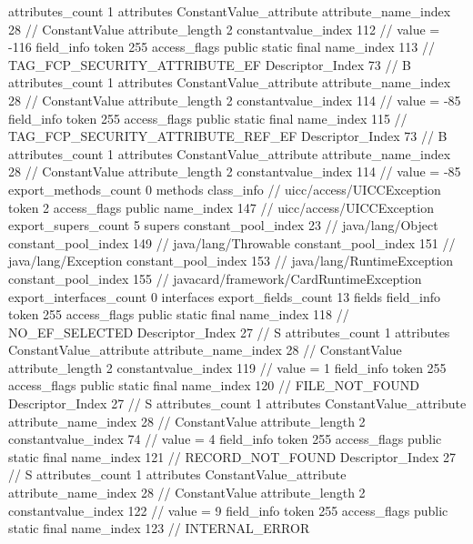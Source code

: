 {{{{{				attributes_count	1
				attributes {
				ConstantValue_attribute {
					attribute_name_index	28		// ConstantValue
					attribute_length	2
					constantvalue_index	112		// value = -116
				}
				}
			}
			field_info {
				token	255
				access_flags	public static final
				name_index	113		// TAG_FCP_SECURITY_ATTRIBUTE_EF
				Descriptor_Index	73		// B
				attributes_count	1
				attributes {
				ConstantValue_attribute {
					attribute_name_index	28		// ConstantValue
					attribute_length	2
					constantvalue_index	114		// value = -85
				}
				}
			}
			field_info {
				token	255
				access_flags	public static final
				name_index	115		// TAG_FCP_SECURITY_ATTRIBUTE_REF_EF
				Descriptor_Index	73		// B
				attributes_count	1
				attributes {
				ConstantValue_attribute {
					attribute_name_index	28		// ConstantValue
					attribute_length	2
					constantvalue_index	114		// value = -85
				}
				}
			}
			}
			export_methods_count	0
			methods {
			}
		}
		class_info {		// uicc/access/UICCException
			token	2
			access_flags	public
			name_index	147		// uicc/access/UICCException
			export_supers_count	5
			supers {
				constant_pool_index	23		// java/lang/Object
				constant_pool_index	149		// java/lang/Throwable
				constant_pool_index	151		// java/lang/Exception
				constant_pool_index	153		// java/lang/RuntimeException
				constant_pool_index	155		// javacard/framework/CardRuntimeException
			}
			export_interfaces_count	0
			interfaces {
			}
			export_fields_count	13
			fields {
			field_info {
				token	255
				access_flags	public static final
				name_index	118		// NO_EF_SELECTED
				Descriptor_Index	27		// S
				attributes_count	1
				attributes {
				ConstantValue_attribute {
					attribute_name_index	28		// ConstantValue
					attribute_length	2
					constantvalue_index	119		// value = 1
				}
				}
			}
			field_info {
				token	255
				access_flags	public static final
				name_index	120		// FILE_NOT_FOUND
				Descriptor_Index	27		// S
				attributes_count	1
				attributes {
				ConstantValue_attribute {
					attribute_name_index	28		// ConstantValue
					attribute_length	2
					constantvalue_index	74		// value = 4
				}
				}
			}
			field_info {
				token	255
				access_flags	public static final
				name_index	121		// RECORD_NOT_FOUND
				Descriptor_Index	27		// S
				attributes_count	1
				attributes {
				ConstantValue_attribute {
					attribute_name_index	28		// ConstantValue
					attribute_length	2
					constantvalue_index	122		// value = 9
				}
				}
			}
			field_info {
				token	255
				access_flags	public static final
				name_index	123		// INTERNAL_ERROR
}}}}}
